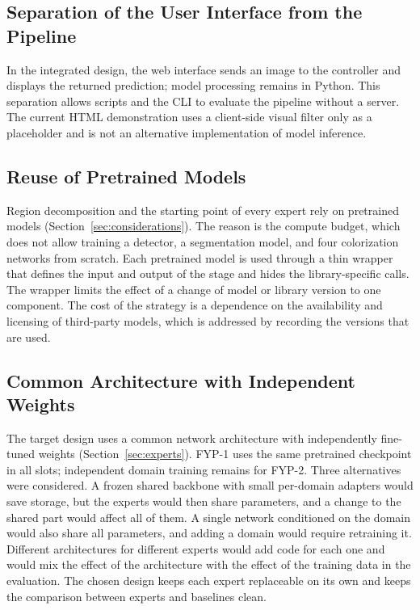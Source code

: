 \documentclass{FastFyp}
\begin{document}
\subsection{Separation of the User Interface from the Pipeline}

In the integrated design, the web interface sends an image to the controller and displays the returned prediction; model processing remains in Python. This separation allows scripts and the CLI to evaluate the pipeline without a server. The current HTML demonstration uses a client-side visual filter only as a placeholder and is not an alternative implementation of model inference.

\subsection{Reuse of Pretrained Models}

Region decomposition and the starting point of every expert rely on pretrained models (Section~\ref{sec:considerations}). The reason is the compute budget, which does not allow training a detector, a segmentation model, and four colorization networks from scratch. Each pretrained model is used through a thin wrapper that defines the input and output of the stage and hides the library-specific calls. The wrapper limits the effect of a change of model or library version to one component. The cost of the strategy is a dependence on the availability and licensing of third-party models, which is addressed by recording the versions that are used.

\subsection{Common Architecture with Independent Weights}

The target design uses a common network architecture with independently fine-tuned weights (Section~\ref{sec:experts}). FYP-1 uses the same pretrained checkpoint in all slots; independent domain training remains for FYP-2. Three alternatives were considered. A frozen shared backbone with small per-domain adapters would save storage, but the experts would then share parameters, and a change to the shared part would affect all of them. A single network conditioned on the domain would also share all parameters, and adding a domain would require retraining it. Different architectures for different experts would add code for each one and would mix the effect of the architecture with the effect of the training data in the evaluation. The chosen design keeps each expert replaceable on its own and keeps the comparison between experts and baselines clean.
\end{document}
